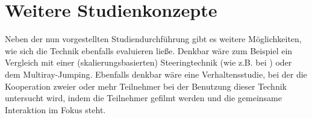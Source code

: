 \section{Weitere Studienkonzepte}
Neben der nun vorgestellten Studiendurchführung gibt es weitere Möglichkeiten, wie sich die Technik ebenfalls evaluieren ließe. Denkbar wäre zum Beispiel ein Vergleich mit einer (skalierungsbasierten) Steeringtechnik (wie z.B. bei \cite{Dallat2018Giant}) oder dem Multiray-Jumping\cite{WeisskerMulti-RayReality}. Ebenfalls denkbar wäre eine Verhaltensstudie, bei der die Kooperation zweier oder mehr Teilnehmer bei der Benutzung dieser Technik untersucht wird, indem die Teilnehmer gefilmt werden und die gemeinsame Interaktion im Fokus steht.